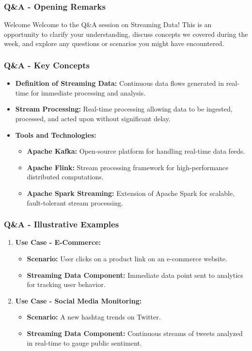\documentclass[aspectratio=169]{beamer}
\begin{document}
\begin{frame}[fragile]
    \frametitle{Q\&A - Opening Remarks}
    \begin{block}{Welcome}
        Welcome to the Q\&A session on Streaming Data! This is an opportunity to clarify your understanding, discuss concepts we covered during the week, and explore any questions or scenarios you might have encountered.
    \end{block}
\end{frame}

\begin{frame}[fragile]
    \frametitle{Q\&A - Key Concepts}
    \begin{itemize}
        \item \textbf{Definition of Streaming Data:} Continuous data flows generated in real-time for immediate processing and analysis.
        \item \textbf{Stream Processing:} Real-time processing allowing data to be ingested, processed, and acted upon without significant delay.
        \item \textbf{Tools and Technologies:}
        \begin{itemize}
            \item \textbf{Apache Kafka:} Open-source platform for handling real-time data feeds.
            \item \textbf{Apache Flink:} Stream processing framework for high-performance distributed computations.
            \item \textbf{Apache Spark Streaming:} Extension of Apache Spark for scalable, fault-tolerant stream processing.
        \end{itemize}
    \end{itemize}
\end{frame}

\begin{frame}[fragile]
    \frametitle{Q\&A - Illustrative Examples}
    \begin{enumerate}
        \item \textbf{Use Case - E-Commerce:}
        \begin{itemize}
            \item \textbf{Scenario:} User clicks on a product link on an e-commerce website.
            \item \textbf{Streaming Data Component:} Immediate data point sent to analytics for tracking user behavior.
        \end{itemize}
        
        \item \textbf{Use Case - Social Media Monitoring:}
        \begin{itemize}
            \item \textbf{Scenario:} A new hashtag trends on Twitter.
            \item \textbf{Streaming Data Component:} Continuous streams of tweets analyzed in real-time to gauge public sentiment.
        \end{itemize}
    \end{enumerate}
\end{frame}
\end{document}
